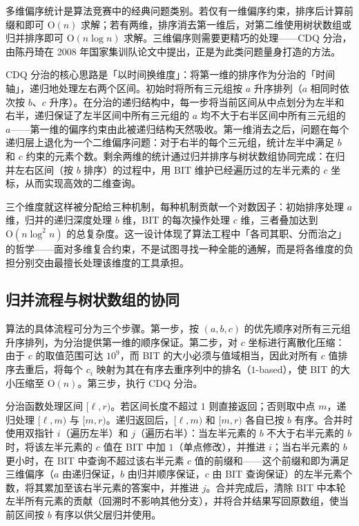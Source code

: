 \documentclass[12pt, a4paper]{academics}
\begin{document}
多维偏序统计是算法竞赛中的经典问题类别。若仅有一维偏序约束，排序后计算前缀和即可 $\mathrm{O}(n)$ 求解；若有两维，排序消去第一维后，对第二维使用树状数组或归并排序即可 $\mathrm{O}(n \log n)$ 求解。三维偏序则需要更精巧的处理——CDQ 分治，由陈丹琦在 2008 年国家集训队论文中提出，正是为此类问题量身打造的方法。

CDQ 分治的核心思路是「以时间换维度」：将第一维的排序作为分治的「时间轴」，递归地处理左右两个区间。初始时将所有三元组按 $a$ 升序排列（$a$ 相同时依次按 $b$、$c$ 升序）。在分治的递归结构中，每一步将当前区间从中点划分为左半和右半，递归保证了左半区间中所有三元组的 $a$ 均不大于右半区间中所有三元组的 $a$——第一维的偏序约束由此被递归结构天然吸收。第一维消去之后，问题在每个递归层上退化为一个二维偏序问题：对于右半的每个三元组，统计左半中满足 $b$ 和 $c$ 约束的元素个数。剩余两维的统计通过归并排序与树状数组协同完成：在归并左右区间（按 $b$ 排序）的过程中，用 BIT 维护已经遍历过的左半元素的 $c$ 坐标，从而实现高效的二维查询。

三个维度就这样被分配给三种机制，每种机制贡献一个对数因子：初始排序处理 $a$ 维，归并的递归深度处理 $b$ 维，BIT 的每次操作处理 $c$ 维，三者叠加达到 $\mathrm{O}(n \log^2 n)$ 的总复杂度。这一设计体现了算法工程中「各司其职、分而治之」的哲学——面对多维复合约束，不是试图寻找一种全能的通解，而是将各维度的负担分别交由最擅长处理该维度的工具承担。

\subsection{归并流程与树状数组的协同}

算法的具体流程可分为三个步骤。第一步，按 $(a, b, c)$ 的优先顺序对所有三元组升序排列，为分治提供第一维的顺序保证。第二步，对 $c$ 坐标进行离散化压缩：由于 $c$ 的取值范围可达 $10^9$，而 BIT 的大小必须与值域相当，因此对所有 $c$ 值排序去重后，将每个 $c_i$ 映射为其在有序去重序列中的排名（$1$-based），使 BIT 的大小压缩至 $\mathrm{O}(n)$。第三步，执行 CDQ 分治。

分治函数处理区间 $[\ell, r)$。若区间长度不超过 $1$ 则直接返回；否则取中点 $m$，递归处理 $[\ell, m)$ 与 $[m, r)$。递归返回后，$[\ell, m)$ 和 $[m, r)$ 各自已按 $b$ 有序。合并时使用双指针 $i$（遍历左半）和 $j$（遍历右半）：当左半元素的 $b$ 不大于右半元素的 $b$ 时，将该左半元素的 $c$ 值在 BIT 中加 $1$（单点修改），并推进 $i$；当右半元素的 $b$ 更小时，在 BIT 中查询不超过该右半元素 $c$ 值的前缀和——这个前缀和即为满足三维偏序（$a$ 由递归保证，$b$ 由归并顺序保证，$c$ 由 BIT 查询保证）的左半元素个数，将其累加至该右半元素的答案中，并推进 $j$。合并完成后，清除 BIT 中本轮左半所有元素的贡献（回溯时不影响其他分支），并将合并结果写回原数组，使当前区间按 $b$ 有序以供父层归并使用。
\end{document}
